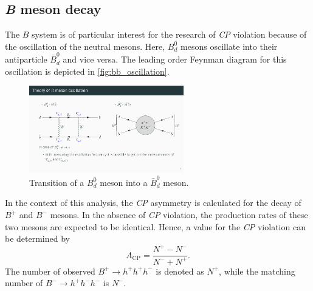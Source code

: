 \subsection{\textit{B} meson decay}
The $B$ system is of particular interest for the research of \textit{CP} violation because of the oscillation of the neutral mesons. Here, $B_d^0$ mesons 
oscillate into their antiparticle $\bar{B}_d^0$ and vice versa. The leading order Feynman diagram for this oscillation is depicted in \autoref{fig:bb_oscillation}.
\begin{figure}
    \centering
    \includegraphics[width=0.6\textwidth]{content/pics/bb_oscillation.pdf}
    \caption{Transition of a $B_d^0$ meson into a $\bar{B}_d^0$ meson.}
    \label{fig:bb_oscillation}
\end{figure}

In the context of this analysis, the \textit{CP} asymmetry is calculated for the decay of $B^+$ and $B^-$ mesons. In the absence of \textit{CP} violation, 
the production rates of these two mesons are expected to be identical. Hence, a value for the \textit{CP} violation can be determined by
\begin{equation}
    A_{\mathrm{CP}} = \frac{N^+-N^-}{N^-+N^+}.
    \label{eq:CP_asymmetry}
\end{equation}
The number of observed $B^+ \rightarrow h^+h^+h^-$ is denoted as $N^+$, while the matching number of $B^- \rightarrow h^+h^-h^-$ is $N^-$.
